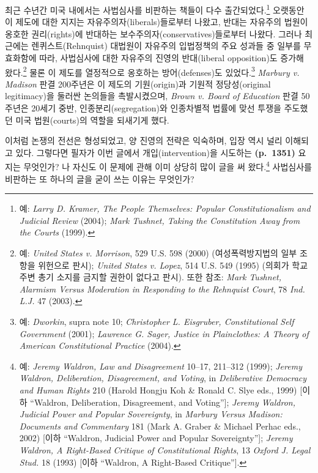 \documentclass[a4paper,12pt,oneside]{article}  %
\begin{document}
최근 수년간 미국 내에서는 사법심사를 비판하는 책들이 다수
출간되었다.\footnote{예: \emph{Larry D. Kramer, The People Themselves:
  Popular Constitutionalism and Judicial Review} (2004); \emph{Mark
  Tushnet, Taking the Constitution Away from the Courts} (1999).}
오랫동안 이 제도에 대한 지지는 자유주의자(liberals)들로부터 나왔고,
반대는 자유주의 법원이 옹호한 권리(rights)에 반대하는
보수주의자(conservatives)들로부터 나왔다. 그러나 최근에는
렌퀴스트(Rehnquist) 대법원이 자유주의 입법정책의 주요 성과들 중 일부를
무효화함에 따라, 사법심사에 대한 자유주의 진영의 반대(liberal
opposition)도 증가해 왔다.\footnote{예: \emph{United States v.
  Morrison}, 529 U.S. 598 (2000) (여성폭력방지법의 일부 조항을 위헌으로
  판시); \emph{United States v. Lopez}, 514 U.S. 549 (1995) (의회가 학교
  주변 총기 소지를 금지할 권한이 없다고 판시). 또한 참조: \emph{Mark
  Tushnet, Alarmism Versus Moderation in Responding to the Rehnquist
  Court}, 78 \emph{Ind. L.J.} 47 (2003).} 물론 이 제도를 열정적으로
옹호하는 방어(defenses)도 있었다.\footnote{예: \emph{Dworkin}, supra
  note 10; \emph{Christopher L. Eisgruber, Constitutional Self
  Government} (2001); \emph{Lawrence G. Sager, Justice in Plainclothes:
  A Theory of American Constitutional Practice} (2004).} \emph{Marbury
v. Madison} 판결 200주년은 이 제도의 기원(origin)과 기원적
정당성(original legitimacy)을 둘러싼 논의들을 촉발시켰으며, \emph{Brown
v. Board of Education} 판결 50주년은 20세기 중반,
인종분리(segregation)와 인종차별적 법률에 맞선 투쟁을 주도했던 미국
법원(courts)의 역할을 되새기게 했다.

이처럼 논쟁의 전선은 형성되었고, 양 진영의 전략은 익숙하며, 입장 역시
널리 이해되고 있다. 그렇다면 필자가 이번 글에서 개입(intervention)을
시도하는 \textbf{(p.~1351)} 요지는 무엇인가? 나 자신도 이 문제에 관해
이미 상당히 많이 글을 써 왔다.\footnote{예: \emph{Jeremy Waldron, Law
  and Disagreement} 10--17, 211--312 (1999); \emph{Jeremy Waldron,
  Deliberation, Disagreement, and Voting}, in \emph{Deliberative
  Democracy and Human Rights} 210 (Harold Hongju Koh \& Ronald C. Slye
  eds., 1999) {[}이하 ``Waldron, Deliberation, Disagreement, and
  Voting''{]}; \emph{Jeremy Waldron, Judicial Power and Popular
  Sovereignty}, in \emph{Marbury Versus Madison: Documents and
  Commentary} 181 (Mark A. Graber \& Michael Perhac eds., 2002) {[}이하
  ``Waldron, Judicial Power and Popular Sovereignty''{]}; \emph{Jeremy
  Waldron, A Right-Based Critique of Constitutional Rights}, 13
  \emph{Oxford J. Legal Stud.} 18 (1993) {[}이하 ``Waldron, A
  Right-Based Critique''{]}.} 사법심사를 비판하는 또 하나의 글을 굳이
쓰는 이유는 무엇인가?
\end{document}
